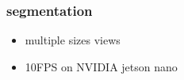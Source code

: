 \documentclass{beamer}
\begin{document}
\begin{frame}
  
  \frametitle{\bf segmentation}    

  
    \begin{itemize}
      \item multiple sizes views
      \item 10FPS on NVIDIA jetson nano
    \end{itemize}
\end{frame}
\end{document}
